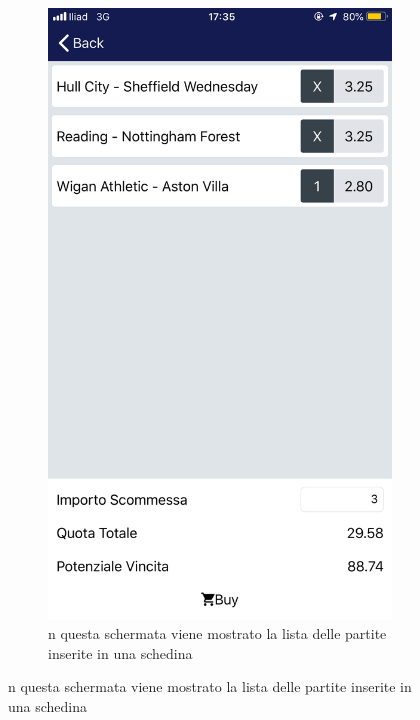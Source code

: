 \documentclass[numbers=noenddot, 12pt, a4paper, oneside]{scrbook}
\begin{document}
\begin{figure}[H]
\begin{subfigure}{.5\textwidth}
		\includegraphics[width=.8\linewidth]{images/Screen/Carrello}
		\caption{n questa schermata viene mostrato la lista delle partite inserite in una schedina}
	\end{subfigure}
\end{figure}
\end{document}
